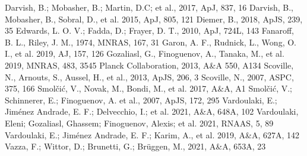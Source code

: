 \documentclass[galaxies,article,submit,moreauthors,pdftex]{Definitions/mdpi}
\begin{document}
\begin{thebibliography}{999}
Darvish, B.; Mobasher, B.; Martin, D.C; et al., 2017, ApJ, 837, 16
Darvish, B., Mobasher, B., Sobral, D., et al. 2015, ApJ, 805, 121
 Diemer, B., 2018, ApJS, 239, 35
 Edwards, L. O. V.; Fadda, D.; Frayer, D. T., 2010, ApJ, 724L, 143
Fanaroff, B. L., Riley, J. M., 1974, MNRAS, 167, 31
 Garon, A. F., Rudnick, L., Wong, O. I., et al. 2019, AJ, 157, 126
  Gozaliasl, G., Finoguenov, A., Tanaka, M., et al. 2019, MNRAS, 483, 3545 
  Planck Collaboration, 2013, A\&A 550, A134
   Scoville, N., Arnouts, S., Aussel, H., et al., 2013, ApJS, 206, 3
   Scoville, N., 2007, ASPC, 375, 166
   Smol\v{c}i\'{c}, V., Novak, M., Bondi, M., et al. 2017, A\&A, A1
   Smol\v{c}i\'{c}, V.; Schinnerer, E.; Finoguenov, A. et al., 2007, ApJS, 172, 295
  Vardoulaki, E.;  Jim\'{e}nez Andrade, E. F.;  Delvecchio, I.; et al. 2021, A\&A, 648A, 102
  Vardoulaki, Eleni;  Gozaliasl, Ghassem; Finoguenov, Alexis; et al. 2021,  RNAAS, 5, 89
  Vardoulaki, E.; Jim\'{e}nez Andrade, E. F.; Karim, A., et al. 2019, A\&A, 627A, 142
 Vazza, F.; Wittor, D.; Brunetti, G.; Br\"{u}ggen, M., 2021, A\&A, 653A, 23
\end{thebibliography}

\end{document}
